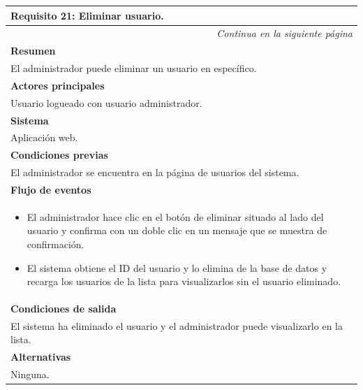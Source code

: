 \begin{longtable}{|p{}|}
\hline
  \rowcolor[gray]{.5}
 \color{white}\textbf{Requisito 21: Eliminar usuario.} \\
\hline
\endfirsthead
\endhead
\hline \multicolumn{1}{r}{\textit{Continua en la siguiente página}} \\
\endfoot
\endlastfoot
    \rowcolor[gray]{.9}
     \textbf{Resumen} \\
     \hline
     El administrador puede eliminar un usuario en específico. \\
     \hline
     \rowcolor[gray]{.9}
     \textbf{Actores principales} \\
     \hline
     Usuario logueado con usuario administrador. \\
     \hline
     \rowcolor[gray]{.9}
     \textbf{Sistema} \\
     \hline
     Aplicación web. \\
     \hline
     \rowcolor[gray]{.9}
     \textbf{Condiciones previas} \\
     \hline
     El administrador se encuentra en la página de usuarios del sistema. \\
     \hline
     \rowcolor[gray]{.9}
     \textbf{Flujo de eventos}  \\
     \hline
    \begin{itemize}
        \item El administrador hace clic en el botón de eliminar situado al lado del usuario y confirma con un doble clic en un mensaje que se muestra de confirmación.
        \item El sistema obtiene el ID del usuario y lo elimina de la base de datos y recarga los usuarios de la lista para visualizarlos sin el usuario eliminado.
    \end{itemize} \\
     \hline
     \rowcolor[gray]{.9}
     \textbf{Condiciones de salida} \\
     \hline
     El sistema ha eliminado el usuario y el administrador puede visualizarlo en la lista. \\
     \hline
     \rowcolor[gray]{.9}
     \textbf{Alternativas}  \\
     \hline
      Ninguna.\\
     \hline
\end{longtable}

